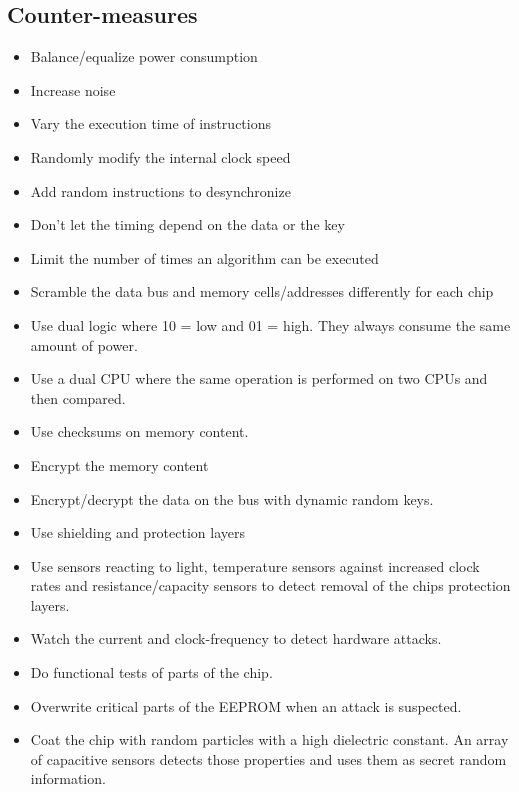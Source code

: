 \subsection{Counter-measures}
\begin{mytitle} \hfill
\begin{itemize}
    \item Balance/equalize power consumption
    \item Increase noise
    \item Vary the execution time of instructions
    \item Randomly modify the internal clock speed
\end{itemize}
\end{mytitle}
\begin{mytitle}\hfill
\begin{itemize}
    \item Add random instructions to desynchronize
    \item Don't let the timing depend on the data or the key
    \item Limit the number of times an algorithm can be executed
\end{itemize}
\end{mytitle}
\begin{mytitle}\hfill
\begin{itemize}
    \item Scramble the data bus and memory cells/addresses differently for each chip
    \item Use dual logic where 10 = low and 01 = high. They always consume the same amount of power.
    \item Use a dual CPU where the same operation is performed on two CPUs and then compared.
    \item Use checksums on memory content.
    \item Encrypt the memory content
    \item Encrypt/decrypt the data on the bus with dynamic random keys.
    \item Use shielding and protection layers
\end{itemize}
\end{mytitle}
\begin{mytitle}\hfill
\begin{itemize}
    \item Use sensors reacting to light, temperature sensors against increased clock rates and resistance/capacity sensors to detect removal of the chips protection layers.
    \item Watch the current and clock-frequency to detect hardware attacks.
    \item Do functional tests of parts of the chip.
    \item Overwrite critical parts of the EEPROM when an attack is suspected.
    \item Coat the chip with random particles with a high dielectric constant. An array of capacitive sensors detects those properties and uses them as secret random information.
\end{itemize}
\end{mytitle}